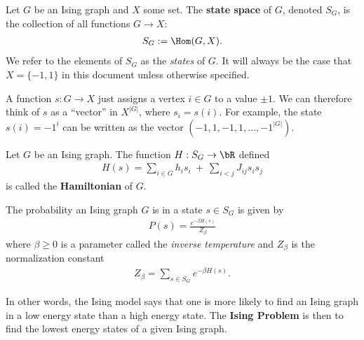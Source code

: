 \documentclass[raggedright, nofonts, notitlepage, openany, debug]{tufte-book}
\begin{document}
\begin{defn}
  Let $G$ be an Ising graph and $X$ some set. The \textbf{state space} of $G$, denoted $S_G$, is the collection of all functions $G\to X$:
  \begin{align*}
    S_G := \Hom(G, X).
  \end{align*}
  We refer to the elements of $S_G$ as the \emph{states} of $G$. It will always be the case that $X = \{-1,1\}$ in this document unless otherwise specified.
\end{defn}
\begin{rmk}
  A function $s:G\to X$ just assigns a vertex $i \in G$ to a value $\pm 1$. We can therefore think of $s$ as a ``vector'' in $X^{|G|}$, where $s_i = s(i)$. For example, the state $s(i) = -1^{i}$ can be written as the vector $(-1,1,-1,1,...,-1^{|G|})$.
\end{rmk}
\begin{defn}
  Let $G$ be an Ising graph. The function $H:S_G\to \bR$ defined
  \begin{align*}
    H(s) = \sum_{i \in G} h_is_i ~+~ \sum_{i< j} J_{ij}s_is_j
  \end{align*}
  is called the \textbf{Hamiltonian} of $G$.
\end{defn}

\begin{model}
  The probability an Ising graph $G$ is in a state $s \in S_G$ is given by
  \begin{align*}
    P(s) = \frac{e^{-\beta H(s)}}{Z_\beta}
  \end{align*}
  where $\beta \geq 0$ is a parameter called the \emph{inverse temperature} and $Z_\beta$ is the normalization constant
  \begin{align*}
    Z_\beta = \sum_{s\in S_G} e^{-\beta H(s)}.
  \end{align*}
\end{model}
In other words, the Ising model says that one is more likely to find an Ising graph in a low energy state than a high energy state. The \textbf{Ising Problem} is then to find the lowest energy states of a given Ising graph.
\end{document}
